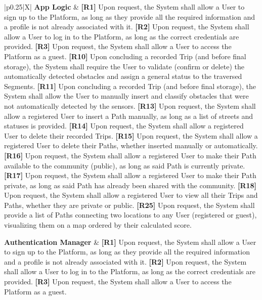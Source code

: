 {\begin{xltabular}{\textwidth}{|p{0.25\textwidth}|X|}
    \textbf{App Logic} & 
    \textbf{[R1]} Upon request, the System shall allow a User to sign up to the Platform, as long as they provide all the required information and a profile is not already associated with it. \newline
    \textbf{[R2]} Upon request, the System shall allow a User to log in to the Platform, as long as the correct credentials are provided. \newline
    \textbf{[R3]} Upon request, the System shall allow a User to access the Platform as a guest. \newline
    \textbf{[R10]} Upon concluding a recorded Trip (and before final storage), the System shall require the User to validate (confirm or delete) the automatically detected obstacles and assign a general status to the traversed Segments. \newline
    \textbf{[R11]} Upon concluding a recorded Trip (and before final storage), the System shall allow the User to manually insert and classify obstacles that were not automatically detected by the sensors. \newline
    \textbf{[R13]} Upon request, the System shall allow a registered User to insert a Path manually, as long as a list of streets and statuses is provided. \newline
    \textbf{[R14]} Upon request, the System shall allow a registered User to delete their recorded Trips. \newline
    \textbf{[R15]} Upon request, the System shall allow a registered User to delete their Paths, whether inserted manually or automatically. \newline
    \textbf{[R16]} Upon request, the System shall allow a registered User to make their Path available to the community (public), as long as said Path is currently private. \newline 
    \textbf{[R17]} Upon request, the System shall allow a registered User to make their Path private, as long as said Path has already been shared with the community. 
    \textbf{[R18]} Upon request, the System shall allow a registered User to view all their Trips and Paths, whether they are private or public. \newline
    \textbf{[R25]} Upon request, the System shall provide a list of Paths connecting two locations to any User (registered or guest), visualizing them on a map ordered by their calculated score. \\
    \hline
    
    \textbf{Authentication Manager} & 
    \textbf{[R1]} Upon request, the System shall allow a User to sign up to the Platform, as long as they provide all the required information and a profile is not already associated with it. \newline
    \textbf{[R2]} Upon request, the System shall allow a User to log in to the Platform, as long as the correct credentials are provided. \newline
    \textbf{[R3]} Upon request, the System shall allow a User to access the Platform as a guest. \\
    \hline


\end{xltabular}}
